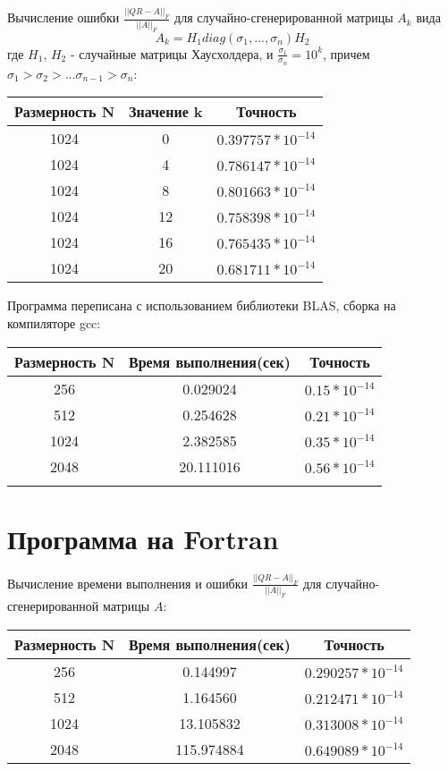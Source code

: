 \documentclass[10pt]{article}
\begin{document}
Вычисление ошибки $\frac{||QR - A||_F}{||A||_F}$ для случайно-сгенерированной матрицы $A_k$
вида
$$ A_k = H_1 diag(\sigma_1, ..., \sigma_n) H_2$$
где $H_1$, $H_2$ - случайные матрицы Хаусхолдера, и $\frac{\sigma_1}{\sigma_n} = 10^k$, причем 
$\sigma_1 > \sigma_2 > ... \sigma_{n-1} > \sigma_n$:
\begin{center}
    \begin{tabular}{c|c|c}
      Размерность N & Значение k & Точность \\
      \hline
      1024 & 0 & $0.397757 * 10^{-14}$ \\
      \hline
      1024 & 4 & $0.786147 * 10^{-14}$ \\
      \hline
      1024 & 8 & $0.801663 * 10^{-14}$ \\
      \hline 
      1024 & 12 & $0.758398 * 10^{-14}$ \\
      \hline
      1024 & 16 & $0.765435 * 10^{-14}$ \\
      \hline
      1024 & 20 & $0.681711 * 10^{-14}$ \\
    \end{tabular}
\end{center}

Программа переписана с использованием библиотеки BLAS, сборка на компиляторе gcc:
\begin{center}
    \begin{tabular}{c|c|c}
      Размерность N & Время выполнения(сек) & Точность \\
      \hline
      256 & 0.029024 & $0.15 * 10^{-14}$ \\
      \hline
      512 &  0.254628 & $0.21 * 10^{-14}$ \\
      \hline
      1024 & 2.382585 & $0.35 * 10^{-14}$ \\
      \hline
      2048 & 20.111016 & $0.56 * 10^{-14}$ \\
      \\
    \end{tabular}
\end{center}

\section{Программа на Fortran}
Вычисление времени выполнения и ошибки $\frac{||QR - A||_F}{||A||_F}$ для случайно-сгенерированной матрицы $A$:
\begin{center}
    \begin{tabular}{c|c|c}
      Размерность N & Время выполнения(сек)& Точность \\
      \hline 
      256 & 0.144997 & $0.290257 * 10^{-14}$ \\
      \hline
      512 &  1.164560 & $0.212471 * 10^{-14}$ \\
      \hline
      1024 & 13.105832 & $0.313008 * 10^{-14}$ \\
      \hline
      2048 & 115.974884 & $0.649089 * 10^{-14}$ \\
    \end{tabular}
\end{center}
\end{document}

